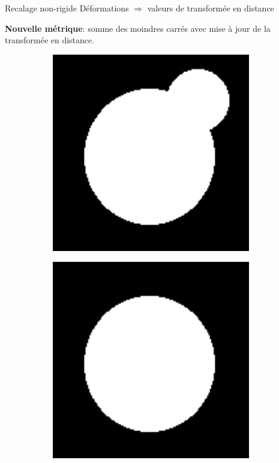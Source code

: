 \documentclass[10pt]{beamer}
\begin{document}
\begin{frame}{Recalage non-rigide}
  Déformations $\Rightarrow$ valeurs de transformée en distance

  \vspace{0.4cm}
  
  \textbf{Nouvelle métrique}: somme des moindres carrés avec mise
  à jour de la transformée en distance.

  \begin{figure}[ht]
  \centering
  \begin{subfigure}[t]{0.2\textwidth}
    \centering
    \includegraphics[width=0.95\textwidth]{fig/registration_reference}
    \caption{}
    \label{subfig:registration_reference}
  \end{subfigure}%
  \begin{subfigure}[t]{0.2\textwidth}
    \centering
    \includegraphics[width=0.95\textwidth]{fig/registration_target}

\end{subfigure}
\end{figure}
\end{frame}
\end{document}
